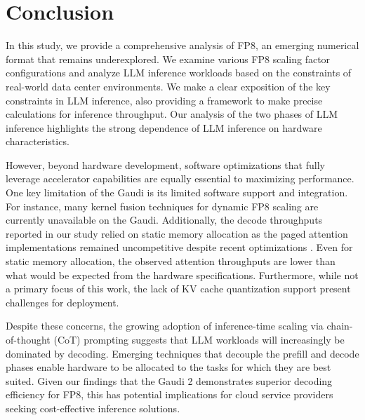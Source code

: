 \section{Conclusion}

In this study, we provide a comprehensive analysis of FP8, an emerging numerical format that remains underexplored. We examine various FP8 scaling factor configurations and analyze LLM inference workloads based on the constraints of real-world data center environments. We make a clear exposition of the key constraints in LLM inference, also providing a framework to make precise calculations for inference throughput.
Our analysis of the two phases of LLM inference highlights the strong dependence of LLM inference on hardware characteristics. 

However, beyond hardware development, software optimizations that fully leverage accelerator capabilities are equally essential to maximizing performance. 
One key limitation of the Gaudi is its limited software support and integration. For instance, many kernel fusion techniques for dynamic FP8 scaling are currently unavailable on the Gaudi. Additionally, the decode throughputs reported in our study relied on static memory allocation as the paged attention implementations remained uncompetitive despite recent optimizations \citep{lee2024debunkingcudamythgpubased}. Even for static memory allocation, the observed attention throughputs are lower than what would be expected from the hardware specifications. Furthermore, while not a primary focus of this work, the lack of KV cache quantization support present challenges for deployment.

Despite these concerns, the growing adoption of inference-time scaling via chain-of-thought (CoT) \citep{cot} prompting suggests that LLM workloads will increasingly be dominated by decoding. Emerging techniques that decouple the prefill and decode phases \citep{splitwise, distserve_ZhongLCHZL0024} enable hardware to be allocated to the tasks for which they are best suited. Given our findings that the Gaudi 2 demonstrates superior decoding efficiency for FP8, this has potential implications for cloud service providers seeking cost-effective inference solutions.
